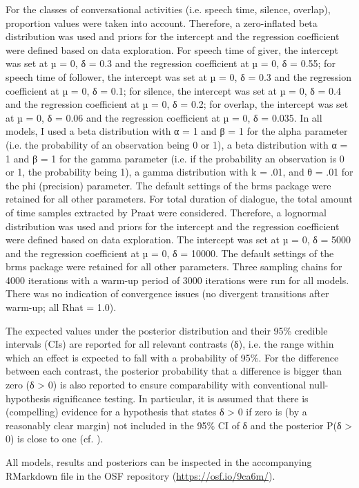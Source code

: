 For the classes of conversational activities (i.e. speech time, silence, overlap), proportion values were taken into account. Therefore, a zero-inflated beta distribution was used and priors for the intercept and the regression coefficient were defined based on data exploration. For speech time of giver, the intercept was set at µ = 0, δ = 0.3 and the regression coefficient at µ = 0, δ = 0.55; for speech time of follower, the intercept was set at µ = 0, δ = 0.3 and the regression coefficient at µ = 0, δ = 0.1; for silence, the intercept was set at µ = 0, δ = 0.4 and the regression coefficient at µ = 0, δ = 0.2; for overlap, the intercept was set at µ = 0, δ = 0.06 and the regression coefficient at µ = 0, δ = 0.035. In all models, I used a beta distribution with α = 1 and β = 1 for the alpha parameter (i.e. the probability of an observation being 0 or 1), a beta distribution with α = 1 and β = 1 for the gamma parameter (i.e. if the probability an observation is 0 or 1, the probability being 1), a gamma distribution with k = .01, and θ = .01 for the phi (precision) parameter. The default settings of the brms package were retained for all other parameters. For total duration of dialogue, the total amount of time samples extracted by Praat were considered. Therefore, a lognormal distribution was used and priors for the intercept and the regression coefficient were defined based on data exploration. The intercept was set at µ = 0, δ = 5000 and the regression coefficient at µ = 0, δ = 10000. The default settings of the brms package were retained for all other parameters. Three sampling chains for 4000 iterations with a warm-up period of 3000 iterations were run for all models. There was no indication of convergence issues (no divergent transitions after warm-up; all Rhat = 1.0).

The expected values under the posterior distribution and their 95\% credible intervals (CIs) are reported for all relevant contrasts (δ), i.e. the range within which an effect is expected to fall with a probability of 95\%. For the difference between each contrast, the posterior probability that a difference is bigger than zero (δ > 0) is also reported to ensure comparability with conventional null-hypothesis significance testing. In particular, it is assumed that there is (compelling) evidence for a hypothesis that states δ > 0 if zero is (by a reasonably clear margin) not included in the 95\% CI of δ and the posterior P(δ > 0) is close to one (cf. \citealt{FrankeRoettger2019}).

All models, results and posteriors can be inspected in the accompanying RMarkdown file in the OSF repository (\url{https://osf.io/9ca6m/}).

